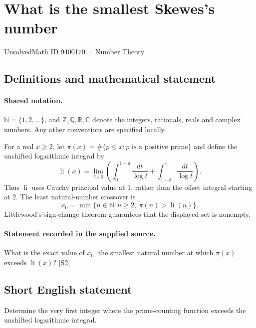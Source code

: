 \documentclass[11pt]{article}
\newcommand{\sref}[2]{\hyperlink{source:#1:#2}{[S#2]}}
\begin{document}
\setcounter{section}{9400169}
\section{What is the smallest Skewes's number}\label{9400170}
{\small\sffamily UnsolvedMath ID 9400170 · Number Theory}
\subsection{Definitions and mathematical statement}

\paragraph{Shared notation.}$\mathbb N=\{1,2,\ldots\}$, and $\mathbb Z,\mathbb Q,\mathbb R,\mathbb C$ denote the integers, rationals, reals and complex numbers. Any other conventions are specified locally.


For a real $x\ge2$, let $\pi(x)=\#\{p\le x:p\text{ is a positive prime}\}$ and define the unshifted logarithmic integral by
\[\operatorname{li}(x)=\lim_{\delta\downarrow0}\left(\int_0^{1-\delta}\frac{dt}{\log t}+\int_{1+\delta}^{x}\frac{dt}{\log t}\right).\]
Thus $\operatorname{li}$ uses Cauchy principal value at $1$, rather than the offset integral starting at $2$. The least natural-number crossover is
\[x_0=\min\{n\in\mathbb N:n\ge2,\ \pi(n)>\operatorname{li}(n)\}.\]
Littlewood's sign-change theorem guarantees that the displayed set is nonempty.
\paragraph{Statement recorded in the supplied source.}
What is the exact value of $x_0$, the smallest natural number at which $\pi(x)$ exceeds $\operatorname{li}(x)$? \sref{9400170}{2}
\subsection{Short English statement}
Determine the very first integer where the prime-counting function exceeds the unshifted logarithmic integral.
\end{document}
